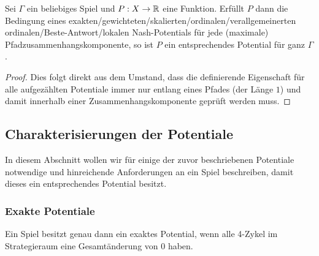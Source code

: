 \begin{beob}\label{beob:KompWeisePotentiale}
	Sei $\Gamma$ ein beliebiges Spiel und $P: X \to \mathbb{R}$ eine Funktion. Erfüllt $P$ dann die Bedingung eines exakten/gewichteten/skalierten/ordinalen/verallgemeinerten ordinalen/Beste-Antwort/lokalen Nash-Potentials für jede (maximale) Pfadzusammenhangskomponente, so ist $P$ ein entsprechendes Potential für ganz $\Gamma$.
\end{beob}

\begin{proof}
	Dies folgt direkt aus dem Umstand, dass die definierende Eigenschaft für alle aufgezählten Potentiale immer nur entlang eines Pfades (der Länge $1$) und damit innerhalb einer Zusammenhangskomponente geprüft werden muss.
\end{proof}


\subsection{Charakterisierungen der Potentiale}

In diesem Abschnitt wollen wir für einige der zuvor beschriebenen Potentiale notwendige und hinreichende Anforderungen an ein Spiel beschreiben, damit dieses ein entsprechendes Potential besitzt.

\subsubsection{Exakte Potentiale}

\begin{satz}\label{satz:CharExPot}
	Ein Spiel besitzt genau dann ein exaktes Potential, wenn alle 4-Zykel im Strategieraum eine Gesamtänderung von $0$ haben.
\end{satz}

